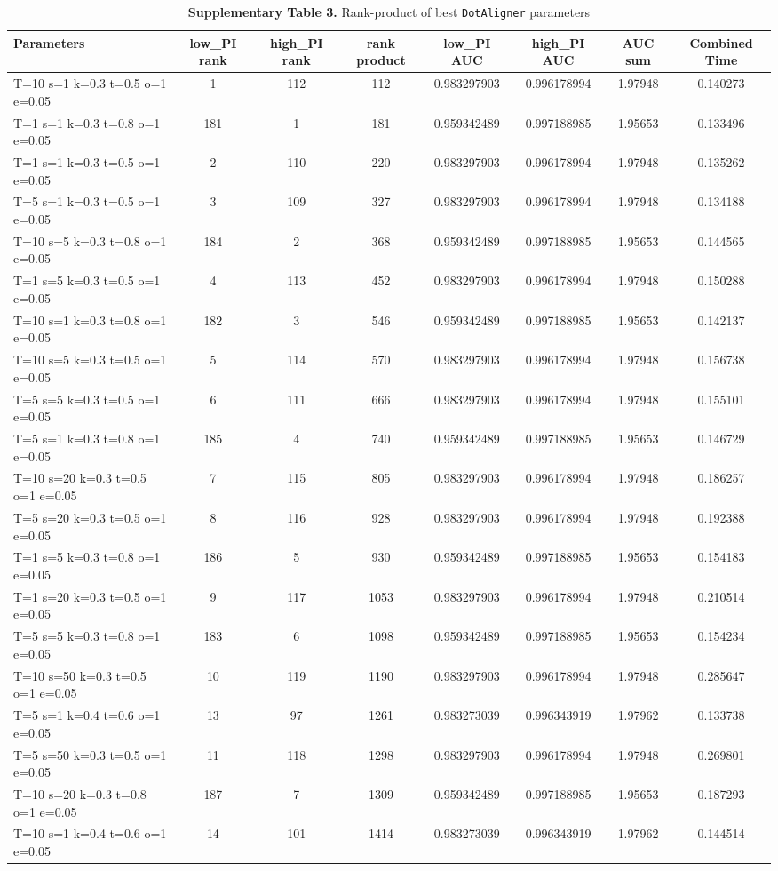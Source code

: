 \documentclass{bmcart}
\newcommand\dotaligner{\texttt{DotAligner}}
\begin{document}
\begin{table}
\caption*{\textbf{Supplementary Table 3.} Rank-product of best \dotaligner{} parameters}
\begin{tabular}{lccccccc}
\hline
Parameters  & low\_PI rank & high\_PI rank & rank product & low\_PI AUC & high\_PI AUC & AUC  sum  & Combined Time  \\
\hline
T=10 s=1 k=0.3 t=0.5 o=1 e=0.05 & 1 & 112 & 112 & 0.983297903 & 0.996178994 & 1.97948 & 0.140273\\
T=1 s=1 k=0.3 t=0.8 o=1 e=0.05 & 181 & 1 & 181 & 0.959342489 & 0.997188985 & 1.95653 & 0.133496\\
T=1 s=1 k=0.3 t=0.5 o=1 e=0.05 & 2 & 110 & 220 & 0.983297903 & 0.996178994 & 1.97948 & 0.135262\\
T=5 s=1 k=0.3 t=0.5 o=1 e=0.05 & 3 & 109 & 327 & 0.983297903 & 0.996178994 & 1.97948 & 0.134188\\
T=10 s=5 k=0.3 t=0.8 o=1 e=0.05 & 184 & 2 & 368 & 0.959342489 & 0.997188985 & 1.95653 & 0.144565\\
T=1 s=5 k=0.3 t=0.5 o=1 e=0.05 & 4 & 113 & 452 & 0.983297903 & 0.996178994 & 1.97948 & 0.150288\\
T=10 s=1 k=0.3 t=0.8 o=1 e=0.05 & 182 & 3 & 546 & 0.959342489 & 0.997188985 & 1.95653 & 0.142137\\
T=10 s=5 k=0.3 t=0.5 o=1 e=0.05 & 5 & 114 & 570 & 0.983297903 & 0.996178994 & 1.97948 & 0.156738\\
T=5 s=5 k=0.3 t=0.5 o=1 e=0.05 & 6 & 111 & 666 & 0.983297903 & 0.996178994 & 1.97948 & 0.155101\\
T=5 s=1 k=0.3 t=0.8 o=1 e=0.05 & 185 & 4 & 740 & 0.959342489 & 0.997188985 & 1.95653 & 0.146729\\
T=10 s=20 k=0.3 t=0.5 o=1 e=0.05 & 7 & 115 & 805 & 0.983297903 & 0.996178994 & 1.97948 & 0.186257\\
T=5 s=20 k=0.3 t=0.5 o=1 e=0.05 & 8 & 116 & 928 & 0.983297903 & 0.996178994 & 1.97948 & 0.192388\\
T=1 s=5 k=0.3 t=0.8 o=1 e=0.05 & 186 & 5 & 930 & 0.959342489 & 0.997188985 & 1.95653 & 0.154183\\
T=1 s=20 k=0.3 t=0.5 o=1 e=0.05 & 9 & 117 & 1053 & 0.983297903 & 0.996178994 & 1.97948 & 0.210514\\
T=5 s=5 k=0.3 t=0.8 o=1 e=0.05 & 183 & 6 & 1098 & 0.959342489 & 0.997188985 & 1.95653 & 0.154234\\
T=10 s=50 k=0.3 t=0.5 o=1 e=0.05 & 10 & 119 & 1190 & 0.983297903 & 0.996178994 & 1.97948 & 0.285647\\
T=5 s=1 k=0.4 t=0.6 o=1 e=0.05 & 13 & 97 & 1261 & 0.983273039 & 0.996343919 & 1.97962 & 0.133738\\
T=5 s=50 k=0.3 t=0.5 o=1 e=0.05 & 11 & 118 & 1298 & 0.983297903 & 0.996178994 & 1.97948 & 0.269801\\
T=10 s=20 k=0.3 t=0.8 o=1 e=0.05 & 187 & 7 & 1309 & 0.959342489 & 0.997188985 & 1.95653 & 0.187293\\
T=10 s=1 k=0.4 t=0.6 o=1 e=0.05 & 14 & 101 & 1414 & 0.983273039 & 0.996343919 & 1.97962 & 0.144514\\
\hline
\end{tabular}
\end{table}
\end{document}
